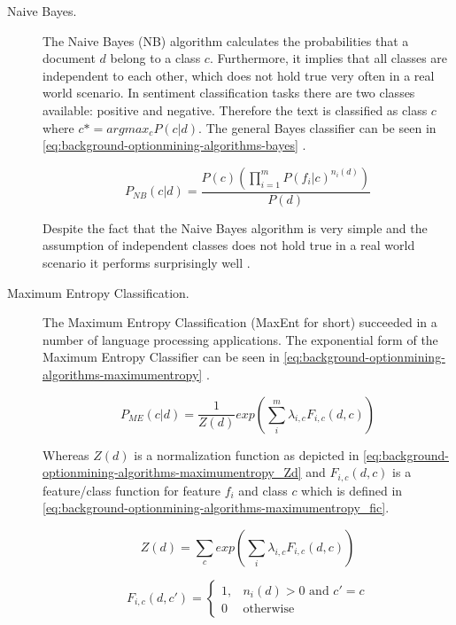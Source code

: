 \begin{description}
	\item[Naive Bayes.] 
	The Naive Bayes (NB) algorithm calculates the probabilities that a document $d$ belong to a class $c$.
	Furthermore, it implies that all classes are independent to each other, which does not hold true very often in a real world scenario.
	In sentiment classification tasks there are two classes available: positive and negative.
	Therefore the text is classified as class $c$ where $c* = arg max_c P(c | d)$.
	The general Bayes classifier can be seen in \autoref{eq:background-optionmining-algorithms-bayes} \cite{Pang2002}.
	
	\begin{equation}
		P_{NB}(c|d) = \frac{P(c) (\prod_{i=1}^{m} P(f_i|c)^{n_i(d)}) }{P(d)}
		\label{eq:background-optionmining-algorithms-bayes}
	\end{equation}
	
	Despite the fact that the Naive Bayes algorithm is very simple and the assumption of independent classes does not hold true in a real world scenario it performs surprisingly well \cite{Pang2002}.
	
	\item[Maximum Entropy Classification.]
  The Maximum Entropy Classification (MaxEnt for short) succeeded in a number of language processing applications.
  The exponential form of the Maximum Entropy Classifier can be seen in \autoref{eq:background-optionmining-algorithms-maximumentropy} \cite{Pang2002}.
  
  \begin{equation}
		P_{ME}(c|d) = \frac{1}{Z(d)} exp \left( \sum_i^m \lambda_{i,c}F_{i,c}(d,c) \right)
		\label{eq:background-optionmining-algorithms-maximumentropy}
  \end{equation}
  
  Whereas $Z(d)$ is a normalization function as depicted in \autoref{eq:background-optionmining-algorithms-maximumentropy_Zd} \cite{Nigam1999} and $F_{i,c}(d,c)$ is a feature/class function for feature $f_i$ and class $c$ which is defined in \autoref{eq:background-optionmining-algorithms-maximumentropy_fic}.

  \begin{equation}
    Z(d) = \sum_c exp(\sum_i \lambda_{i,c} F_{i,c}(d,c))
      \label{eq:background-optionmining-algorithms-maximumentropy_Zd}
  \end{equation}

  \begin{equation}
  F_{i,c}(d,c') = 
    \begin{cases}
      1, & n_i(d) > 0 \text{ and } c' = c \\
      0  & \text{otherwise}
    \end{cases}
		\label{eq:background-optionmining-algorithms-maximumentropy_fic}
  \end{equation}


\end{description}
